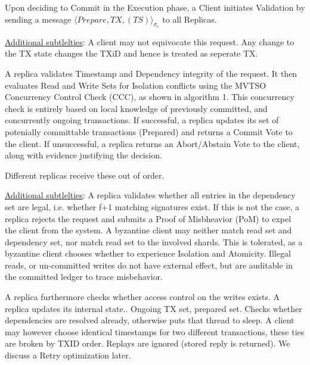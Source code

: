 Upon deciding to Commit in the Execution phase, a Client initiates Validation by sending a message $\langle Prepare, TX, (TS) \rangle_{\sigma_c}$ to all Replicas.

\underline{Additional subtlelties}: A client may not equivocate this request. Any change to the TX state changes the TXiD and hence is treated as seperate TX. 

A replica validates Timestamp and Dependency integrity of the request. It then evaluates Read and Write Sets for Isolation conflicts using the MVTSO Concurrency Control Check (CCC), as shown in algorithm 1. This concurrency check is entirely based on local knowledge of previously committed, and concurrently ongoing transactions. If successful, a replica updates its set of potenially committable transactions (Prepared) and returns a Commit Vote to the client. If unsuccessful, a replica returns an Abort/Abstain Vote to the client, along with evidence justifying the decision. 

Different replicas receive these out of order.

\underline{Additional subtlelties}: A replica validates whether all entries in the dependency set are legal, i.e. whether f+1 matching signatures exist. If this is not the case, a replica rejects the request and submits a Proof of Misbheavior (PoM) to expel the client from the system. A byzantine client may neither match read set and dependency set, nor match read set to the involved shards. This is tolerated, as a byzantine client chooses whether to experience Isolation and Atomicity. Illegal reads, or un-committed writes do not have external effect, but are auditable in the committed ledger to trace misbehavior.

A replica furthermore checks whether access control on the writes exists.
A replica updates its internal state.. Ongoing TX set, prepared set. Checks whether dependencies are resolved already, otherwise puts that thread to sleep. 
A client may however choose identical timestamps for two different transactions, these ties are broken by TXID order. Replays are ignored (stored reply is returned). We discuss a Retry optimization later.


